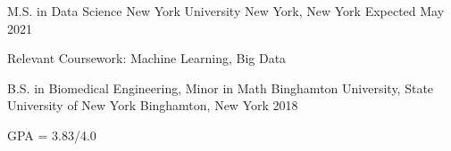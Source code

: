 

\begin{cventries}

  \cventry
    {M.S. in Data Science} %
    {New York University} %
    {New York, New York} %
    {Expected May 2021} %
    {
      \begin{cvitems} %
		\item {Relevant Coursework: Machine Learning, Big Data}
      \end{cvitems}
    }


  \cventry
    {B.S. in Biomedical Engineering, Minor in Math} %
    {Binghamton University, State University of New York} %
    {Binghamton, New York} %
    {2018} %
    {
      \begin{cvitems} %
        \item {GPA = 3.83/4.0}
      \end{cvitems}
    }

\end{cventries}
